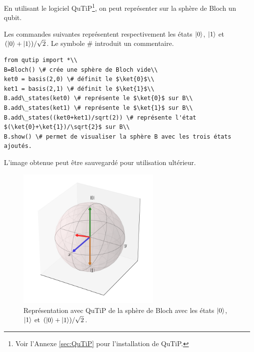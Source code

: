 En utilisant le logiciel QuTiP\footnote{Voir l'Annexe \ref{sec:QuTiP} pour 
l'installation de QuTiP.}, on peut représenter sur la sphère de Bloch un 
qubit.

Les commandes suivantes représentent respectivement les états $\vert0\rangle$, 
$\vert1\rangle$ et $(\vert0\rangle+\vert1\rangle)/\sqrt{2}$. Le symbole \# introduit un 
commentaire.

\begin{lstlisting}
from qutip import *\\
B=Bloch() \# crée une sphère de Bloch vide\\
ket0 = basis(2,0) \# définit le $\ket{0}$\\
ket1 = basis(2,1) \# définit le $\ket{1}$\\
B.add\_states(ket0) \# représente le $\ket{0}$ sur B\\
B.add\_states(ket1) \# représente le $\ket{1}$ sur B\\
B.add\_states((ket0+ket1)/sqrt(2)) \# représente l'état 
$(\ket{0}+\ket{1})/\sqrt{2}$ sur B\\
B.show() \# permet de visualiser la sphère B avec les trois états ajoutés.
\end{lstlisting}
L'image obtenue peut être sauvegardé pour utilisation ultérieur.

\begin{figure}[!h]
\begin{center}
\includegraphics[height=7cm]{graphics/Bloch3.png}
\caption{Représentation avec QuTiP de la sphère de Bloch avec les états 
$\vert0\rangle$, $\vert1\rangle$ et $(\vert0\rangle+\vert1\rangle)/\sqrt{2}$.}
\end{center}
\end{figure}
